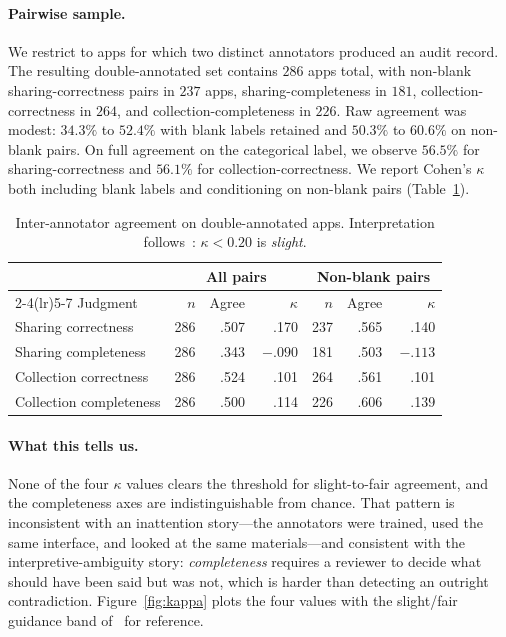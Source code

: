 \documentclass[11pt,a4paper]{article}
\begin{document}
\paragraph{Pairwise sample.}
We restrict to apps for which two distinct annotators produced an
audit record. The resulting double-annotated set contains $286$ apps
total, with non-blank sharing-correctness pairs in $237$ apps,
sharing-completeness in $181$, collection-correctness in $264$, and
collection-completeness in $226$. Raw agreement was modest: $34.3\%$ to
$52.4\%$ with blank labels retained and $50.3\%$ to $60.6\%$ on
non-blank pairs. On full agreement on the categorical label, we
observe $56.5\%$ for sharing-correctness and $56.1\%$ for
collection-correctness. We report Cohen's $\kappa$ both including blank
labels and conditioning on non-blank pairs (Table~\ref{tab:kappa}).

\begin{table}[t]
\centering\small
\caption{Inter-annotator agreement on double-annotated apps.
Interpretation follows~\citet{landis1977measurement}: $\kappa<0.20$ is
\emph{slight}.}
\label{tab:kappa}
\begin{tabular}{lrrrrrr}
\toprule
& \multicolumn{3}{c}{All pairs} & \multicolumn{3}{c}{Non-blank pairs}\\
\cmidrule(lr){2-4}\cmidrule(lr){5-7}
Judgment & $n$ & Agree & $\kappa$ & $n$ & Agree & $\kappa$\\
\midrule
Sharing correctness     & 286 & .507 & ~~.170 & 237 & .565 & ~~.140\\
Sharing completeness    & 286 & .343 & $-.090$ & 181 & .503 & $-.113$\\
Collection correctness  & 286 & .524 & ~~.101 & 264 & .561 & ~~.101\\
Collection completeness & 286 & .500 & ~~.114 & 226 & .606 & ~~.139\\
\bottomrule
\end{tabular}
\end{table}

\paragraph{What this tells us.}
None of the four $\kappa$ values clears the threshold for
slight-to-fair agreement, and the completeness axes are
indistinguishable from chance. That pattern is inconsistent with an
inattention story---the annotators were trained, used the same
interface, and looked at the same materials---and consistent with the
interpretive-ambiguity story: \emph{completeness} requires a reviewer
to decide what should have been said but was not, which is harder than
detecting an outright contradiction. Figure~\ref{fig:kappa} plots the
four values with the slight/fair guidance band
of~\citet{landis1977measurement} for reference.
\end{document}
